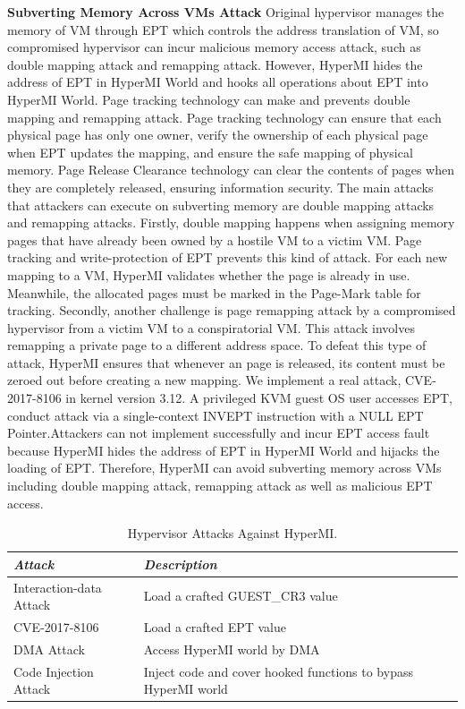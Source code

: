\documentclass[conference]{IEEEtran}
\begin{document}
\textbf{Subverting Memory Across VMs Attack}
Original hypervisor manages the memory of VM through EPT which controls the address translation of VM, so compromised hypervisor can incur malicious memory access attack, such as double mapping attack and remapping attack. However, HyperMI hides the address of EPT in HyperMI World and hooks all operations about EPT into HyperMI World. Page tracking technology can make and prevents double mapping and remapping attack. Page tracking technology can ensure that each physical page has only one owner, verify the ownership of each physical page when EPT updates the mapping, and ensure the safe mapping of physical memory. Page Release Clearance technology can clear the contents of pages when they are completely released, ensuring information security.
%
The main attacks that attackers can execute on subverting memory are double mapping attacks and remapping attacks.
Firstly, double mapping happens when assigning memory pages that have already been owned by a hostile VM to a victim VM. Page tracking and write-protection of EPT prevents this kind of attack. For each new mapping to a VM, HyperMI validates whether the page is already in use. Meanwhile, the allocated pages must be marked in the Page-Mark table for tracking. Secondly, another challenge is page remapping attack by a compromised hypervisor from a victim VM to a conspiratorial VM. This attack involves remapping a private page to a different address space. To defeat this type of attack, HyperMI ensures that whenever an page is released, its content must be zeroed out before creating a new mapping.
We implement a real attack, CVE-2017-8106 in kernel version 3.12. A privileged KVM guest OS user accesses EPT, conduct attack via a single-context INVEPT instruction with a NULL EPT Pointer.Attackers can not implement successfully and incur EPT access fault because HyperMI hides the address of EPT in HyperMI World and hijacks the loading of EPT. Therefore, HyperMI can avoid subverting memory across VMs including double mapping attack, remapping attack as well as malicious EPT access.


\begin{table}
\centering
\caption{Hypervisor Attacks Against HyperMI.}\label{tab3}
\begin{tabular}{p{2.8cm}|p{5.5cm}}
\hline
{\itshape\bfseries Attack} & {\itshape\bfseries Description} \\
\hline
Interaction-data Attack & Load a crafted GUEST\_CR3 value\\
\hline
CVE-2017-8106 & Load a crafted EPT value \\
\hline
DMA Attack & Access HyperMI world by DMA \\
\hline
Code Injection Attack & Inject code and cover hooked functions to bypass HyperMI world \\
\hline
\end{tabular}
\end{table}
\end{document}
